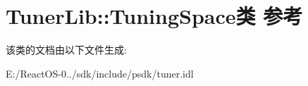 \hypertarget{class_tuner_lib_1_1_tuning_space}{}\section{Tuner\+Lib\+:\+:Tuning\+Space类 参考}
\label{class_tuner_lib_1_1_tuning_space}


该类的文档由以下文件生成\+:\begin{DoxyCompactItemize}
\item 
E\+:/\+React\+O\+S-\/0../sdk/include/psdk/tuner.\+idl\end{DoxyCompactItemize}

